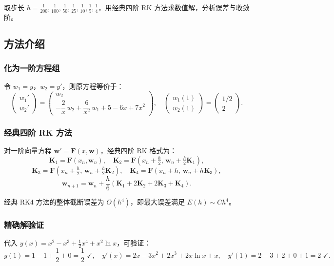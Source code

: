 \documentclass[UTF8,a4paper,11pt]{article}
\begin{document}
取步长 $h = \frac{1}{200},\frac{1}{100},\frac{1}{50},\frac{1}{25},\frac{1}{10},\frac{1}{5},\frac{1}{4}$，用经典四阶 RK 方法求数值解，分析误差与收敛阶。

\subsection{方法介绍}

\subsubsection*{化为一阶方程组}

令 $w_1 = y$，$w_2 = y'$，则原方程等价于：
\[
  \begin{pmatrix} w_1' \\ w_2' \end{pmatrix}
  =
  \begin{pmatrix} w_2 \\ -\dfrac{2}{x}\,w_2 + \dfrac{6}{x^2}\,w_1 + 5 - 6x + 7x^2 \end{pmatrix},
  \quad
  \begin{pmatrix} w_1(1) \\ w_2(1) \end{pmatrix}
  =
  \begin{pmatrix} 1/2 \\ 2 \end{pmatrix}.
\]

\subsubsection*{经典四阶 RK 方法}

对一阶向量方程 $\bm{w}' = \bm{F}(x, \bm{w})$，经典四阶 RK 格式为：
\[
  \bm{K}_1 = \bm{F}(x_n, \bm{w}_n),\quad
  \bm{K}_2 = \bm{F}\!\left(x_n+\tfrac{h}{2},\,\bm{w}_n+\tfrac{h}{2}\bm{K}_1\right),
\]
\[
  \bm{K}_3 = \bm{F}\!\left(x_n+\tfrac{h}{2},\,\bm{w}_n+\tfrac{h}{2}\bm{K}_2\right),\quad
  \bm{K}_4 = \bm{F}(x_n+h,\,\bm{w}_n+h\bm{K}_3),
\]
\[
  \bm{w}_{n+1} = \bm{w}_n + \frac{h}{6}(\bm{K}_1 + 2\bm{K}_2 + 2\bm{K}_3 + \bm{K}_4).
\]

经典 RK4 方法的整体截断误差为 $O(h^4)$，即最大误差满足 $E(h) \sim C h^4$。

\subsubsection*{精确解验证}

代入 $y(x) = x^2 - x^3 + \frac{1}{2}x^4 + x^2\ln x$，可验证：
\[
  y(1) = 1 - 1 + \frac{1}{2} + 0 = \frac{1}{2}\;\checkmark,\quad
  y'(x) = 2x - 3x^2 + 2x^3 + 2x\ln x + x,
  \quad y'(1) = 2 - 3 + 2 + 0 + 1 = 2\;\checkmark.
\]
\end{document}
